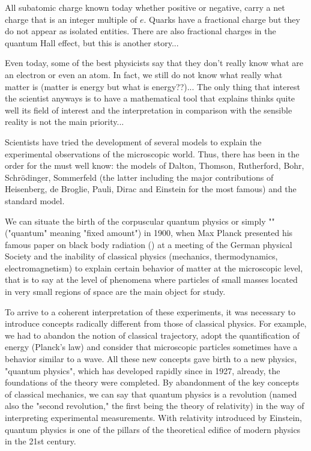 	All subatomic charge known today whether positive or negative, carry a net charge that is an integer multiple of $e$. Quarks have a fractional charge but they do not appear as isolated entities. There are also fractional charges in the quantum Hall effect, but this is another story...

	Even today, some of the best physicists say that they don't really know what are an electron or even an atom. In fact, we still do not know what really what matter is (matter is energy but what is energy??)... The only thing that interest the scientist anyways is to have a mathematical tool that explains thinks quite well its field of interest and the interpretation in comparison with the sensible reality is not the main priority...

	Scientists have tried the development of several models to explain the experimental  observations of the microscopic world. Thus, there has been in the order for the must well know: the models of Dalton, Thomson, Rutherford, Bohr, Schrödinger, Sommerfeld (the latter including the major contributions of Heisenberg, de Broglie, Pauli, Dirac and Einstein for the most famous) and the standard model.

	We can situate the birth of the corpuscular quantum physics or simply "" ("quantum" meaning "fixed amount") in 1900, when Max Planck presented his famous paper on black body radiation () at a meeting of the German physical Society and the inability of classical physics (mechanics, thermodynamics, electromagnetism) to explain certain behavior of matter at the microscopic level, that is to say at the level of phenomena where particles of small masses located in very small regions of space are the main object for study.

	To arrive to a coherent interpretation of these experiments, it was necessary to introduce concepts radically different from those of classical physics. For example, we had to abandon the notion of classical trajectory, adopt the  quantification of energy (Planck's law) and consider that microscopic particles sometimes have a behavior similar to a wave. All these new concepts gave birth to a new physics, "quantum physics", which has developed rapidly since  in 1927, already, the foundations of the theory were completed. By abandonment of the key concepts of classical mechanics, we can say that quantum physics is a revolution (named also the "second revolution," the first being the theory of relativity) in the way of interpreting experimental measurements. With relativity introduced by Einstein, quantum physics is one of the pillars of the theoretical edifice of modern physics in the 21st century.

